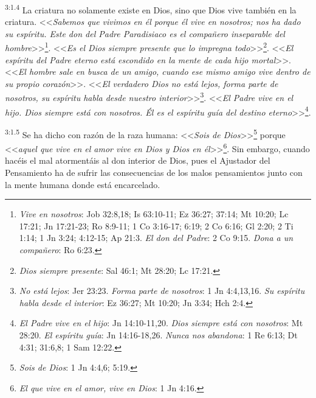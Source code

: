 \par
\textsuperscript{3:1.4} La criatura no solamente existe en Dios, sino que Dios vive también en la criatura. <<\textit{Sabemos que vivimos en él porque él vive en nosotros; nos ha dado su espíritu. Este don del Padre Paradisiaco es el compañero inseparable del hombre}>>\footnote{\textit{Vive en nosotros}: Job 32:8,18; Is 63:10-11; Ez 36:27; 37:14; Mt 10:20; Lc 17:21; Jn 17:21-23; Ro 8:9-11; 1 Co 3:16-17; 6:19; 2 Co 6:16; Gl 2:20; 2 Ti 1:14; 1 Jn 3:24; 4:12-15; Ap 21:3. \textit{El don del Padre}: 2 Co 9:15. \textit{Dona a un compañero}: Ro 6:23.}. <<\textit{Es el Dios siempre presente que lo impregna todo}>>\footnote{\textit{Dios siempre presente}: Sal 46:1; Mt 28:20; Lc 17:21.}. <<\textit{El espíritu del Padre eterno está escondido en la mente de cada hijo mortal}>>. <<\textit{El hombre sale en busca de un amigo, cuando ese mismo amigo vive dentro de su propio corazón}>>. <<\textit{El verdadero Dios no está lejos, forma parte de nosotros, su espíritu habla desde nuestro interior}>>\footnote{\textit{No está lejos}: Jer 23:23. \textit{Forma parte de nosotros}: 1 Jn 4:4,13,16. \textit{Su espíritu habla desde el interior}: Ez 36:27; Mt 10:20; Jn 3:34; Hch 2:4.}. <<\textit{El Padre vive en el hijo. Dios siempre está con nosotros. Él es el espíritu guía del destino eterno}>>\footnote{\textit{El Padre vive en el hijo}: Jn 14:10-11,20. \textit{Dios siempre está con nosotros}: Mt 28:20. \textit{El espíritu guía}: Jn 14:16-18,26. \textit{Nunca nos abandona}: 1 Re 6:13; Dt 4:31; 31:6,8; 1 Sam 12:22.}.

\par
\textsuperscript{3:1.5} Se ha dicho con razón de la raza humana: <<\textit{Sois de Dios}>>\footnote{\textit{Sois de Dios}: 1 Jn 4:4,6; 5:19.} porque <<\textit{aquel que vive en el amor vive en Dios y Dios en él}>>\footnote{\textit{El que vive en el amor, vive en Dios}: 1 Jn 4:16.}. Sin embargo, cuando hacéis el mal atormentáis al don interior de Dios, pues el Ajustador del Pensamiento ha de sufrir las consecuencias de los malos pensamientos junto con la mente humana donde está encarcelado.

